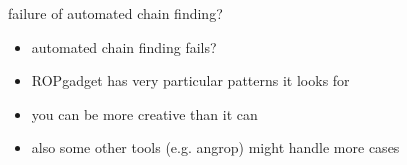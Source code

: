\begin{frame}{failure of automated chain finding?}
    \begin{itemize}
    \item automated chain finding fails?
    \vspace{.5cm}
    \item ROPgadget has very particular patterns it looks for
    \item you can be more creative than it can
    \vspace{.5cm}
    \item also some other tools (e.g. angrop) might handle more cases
    \end{itemize}
\end{frame}
